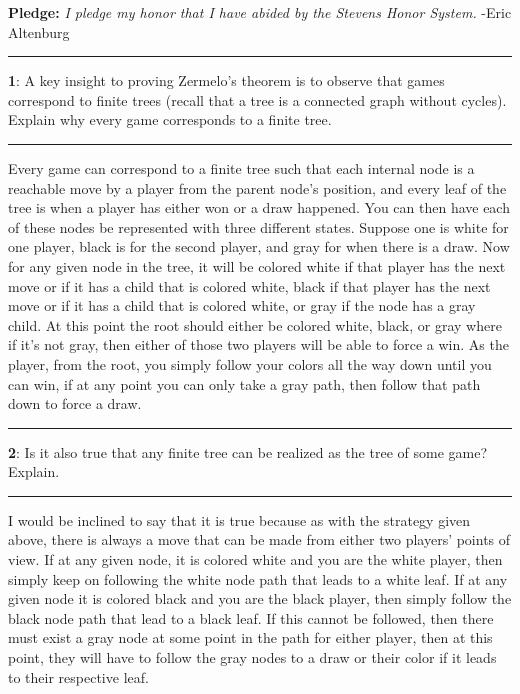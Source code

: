 \documentclass[11pt]{article}
\newcommand\question[2]{\vspace{.25in}\hrule\textbf{#1}: #2\vspace{.5em}\hrule\vspace{.10in}}
\begin{document}
\raggedright
\newcommand\NAME{Eric Altenburg}  %
\newcommand\COURSE{MA-240}
\newcommand\HWNUM{17}              %


\textbf{Pledge:} \textit{I pledge my honor that I have abided by the Stevens Honor System.} -Eric Altenburg

\question{1}{A key insight to proving Zermelo's theorem is to observe that games correspond to finite trees (recall that a tree is a connected graph without cycles). Explain why every game corresponds to a finite tree.}
Every game can correspond to a finite tree such that each internal node is a reachable move by a player from the parent node's position, and every leaf of the tree is when a player has either won or a draw happened. You can then have each of these nodes be represented with three different states. Suppose one is white for one player, black is for the second player, and gray for when there is a draw. Now for any given node in the tree, it will be colored white if that player has the next move or if it has a child that is colored white, black if that player has the next move or if it has a child that is colored white, or gray if the node has a gray child. At this point the root should either be colored white, black, or gray where if it's not gray, then either of those two players will be able to force a win. As the player, from the root, you simply follow your colors all the way down until you can win, if at any point you can only take a gray path, then follow that path down to force a draw.

\question{2}{Is it also true that any finite tree can be realized as the tree of some game? Explain.}

I would be inclined to say that it is true because as with the strategy given above, there is always a move that can be made from either two players' points of view. If at any given node, it is colored white and you are the white player, then simply keep on following the white node path that leads to a white leaf. If at any given node it is colored black and you are the black player, then simply follow the black node path that lead to a black leaf. If this cannot be followed, then there must exist a gray node at some point in the path for either player, then at this point, they will have to follow the gray nodes to a draw or their color if it leads to their respective leaf.
\end{document}
